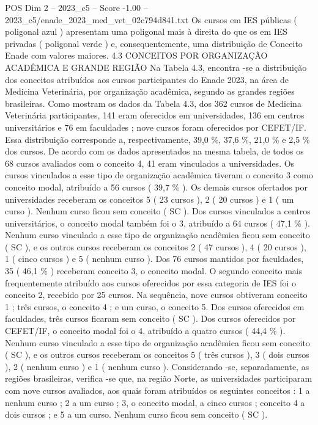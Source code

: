 \begin{textsample}{POS Dim 2 – 2023\_c5 – Score -1.00 – 2023\_c5/enade\_2023\_med\_vet\_02c794d841.txt}
Os cursos em IES públicas ( poligonal azul ) apresentam uma poligonal mais à direita do que os em IES privadas ( poligonal verde ) e, consequentemente, uma distribuição de Conceito Enade com valores maiores. 4.3 CONCEITOS POR ORGANIZAÇÃO ACADÊMICA E GRANDE REGIÃO Na Tabela 4.3, encontra -se a distribuição dos conceitos atribuídos aos cursos participantes do Enade 2023, na área de Medicina Veterinária, por organização acadêmica, segundo as grandes regiões brasileiras.
Como mostram os dados da Tabela 4.3, dos 362 cursos de Medicina Veterinária participantes, 141 eram oferecidos em universidades, 136 em centros universitários e 76 em faculdades ; nove cursos foram oferecidos por CEFET/IF.
Essa distribuição corresponde a, respectivamente, 39,0 \%, 37,6 \%, 21,0 \% e 2,5 \% dos cursos.
De acordo com os dados apresentados na mesma tabela, de todos os 68 cursos avaliados com o conceito 4, 41 eram vinculados a universidades.
Os cursos vinculados a esse tipo de organização acadêmica tiveram o conceito 3 como conceito modal, atribuído a 56 cursos ( 39,7 \% ).
Os demais cursos ofertados por universidades receberam os conceitos 5 ( 23 cursos ), 2 ( 20 cursos ) e 1 ( um curso ).
Nenhum curso ficou sem conceito ( SC ).
Dos cursos vinculados a centros universitários, o conceito modal também foi o 3, atribuído a 64 cursos ( 47,1 \% ).
Nenhum curso vinculado a esse tipo de organização acadêmica ficou sem conceito ( SC ), e os outros cursos receberam os conceitos 2 ( 47 cursos ), 4 ( 20 cursos ), 1 ( cinco cursos ) e 5 ( nenhum curso ).
Dos 76 cursos mantidos por faculdades, 35 ( 46,1 \% ) receberam conceito 3, o conceito modal.
O segundo conceito mais frequentemente atribuído aos cursos oferecidos por essa categoria de IES foi o conceito 2, recebido por 25 cursos.
Na sequência, nove cursos obtiveram conceito 1 ; três cursos, o conceito 4 ; e um curso, o conceito 5.
Dos cursos oferecidos em faculdades, três cursos ficaram sem conceito ( SC ).
Dos cursos oferecidos por CEFET/IF, o conceito modal foi o 4, atribuído a quatro cursos ( 44,4 \% ).
Nenhum curso vinculado a esse tipo de organização acadêmica ficou sem conceito ( SC ), e os outros cursos receberam os conceitos 5 ( três cursos ), 3 ( dois cursos ), 2 ( nenhum curso ) e 1 ( nenhum curso ).
Considerando -se, separadamente, as regiões brasileiras, verifica -se que, na região Norte, as universidades participaram com nove cursos avaliados, aos quais foram atribuídos os seguintes conceitos : 1 a nenhum curso ; 2 a um curso ; 3, o conceito modal, a cinco cursos ; conceito 4 a dois cursos ; e 5 a um curso.
Nenhum curso ficou sem conceito ( SC ).

\end{textsample}

